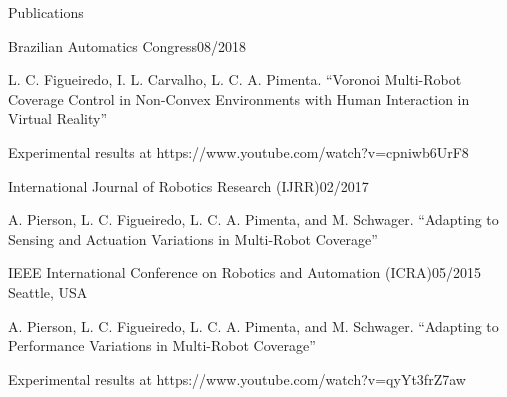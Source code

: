 \documentclass[12pt, a4paper]{resume} %
\begin{document}
\begin{rSection}{Publications}

	\begin{rSubsection}{Brazilian Automatics Congress}{08/2018}{}{}

		\item L. C. Figueiredo, I. L. Carvalho, L. C. A. Pimenta. ``Voronoi Multi-Robot Coverage Control in Non-Convex Environments with Human Interaction in Virtual Reality''
		\item Experimental results at https://www.youtube.com/watch?v=cpniwb6UrF8

	\end{rSubsection}

	\begin{rSubsection}{International Journal of Robotics Research (IJRR)}{02/2017}{}{}

		\item A. Pierson, L. C. Figueiredo, L. C. A. Pimenta, and M. Schwager. ``Adapting to Sensing and Actuation Variations in Multi-Robot Coverage''

	\end{rSubsection}

	\begin{rSubsection}{IEEE International Conference on Robotics and Automation (ICRA)}{05/2015}{}{ \normalfont Seattle, USA}

		\item A. Pierson, L. C. Figueiredo, L. C. A. Pimenta, and M. Schwager. ``Adapting to Performance Variations in Multi-Robot Coverage''
		\item Experimental results at https://www.youtube.com/watch?v=qyYt3frZ7aw


	\end{rSubsection}


\end{rSection}



\end{document}

